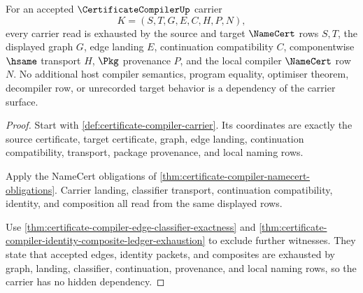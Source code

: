 \begin{theorem}
\label{thm:certificate-compiler-carrier-scope}
For an accepted $\CertificateCompilerUp$ carrier
$$
K=(S,T,G,E,C,H,P,N),
$$
every carrier read is exhausted by the source and target $\NameCert$ rows
$S,T$, the displayed graph $G$, edge landing $E$, continuation compatibility
$C$, componentwise $\hsame$ transport $H$, $\Pkg$ provenance $P$, and the
local compiler $\NameCert$ row $N$. No additional host compiler semantics,
program equality, optimiser theorem, decompiler row, or unrecorded target
behavior is a dependency of the carrier surface.
\end{theorem}
\begin{proof}
Start with \autoref{def:certificate-compiler-carrier}. Its coordinates are
exactly the source certificate, target certificate, graph, edge landing,
continuation compatibility, transport, package provenance, and local naming
rows.

Apply the NameCert obligations of
\autoref{thm:certificate-compiler-namecert-obligations}. Carrier landing,
classifier transport, continuation compatibility, identity, and composition
all read from the same displayed rows.

Use \autoref{thm:certificate-compiler-edge-classifier-exactness} and
\autoref{thm:certificate-compiler-identity-composite-ledger-exhaustion} to
exclude further witnesses. They state that accepted edges, identity packets,
and composites are exhausted by graph, landing, classifier, continuation,
provenance, and local naming rows, so the carrier has no hidden dependency.
\end{proof}

